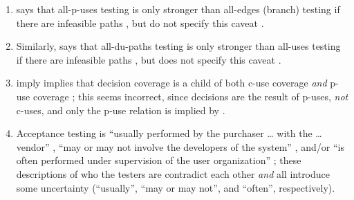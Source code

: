 \begin{enumerate}
          every use (both \acs{p-use} and \acs{c-use}) of that definition (with no
          intervening definitions)'' (\citealp[p.~29]{IEEE2021}; similar in
          \citeyear[p.~125]{IEEE2017}; \citealp[p.~5-13]{SWEBOK2024};
          \citealp[p.~479]{PetersAndPedrycz2000}); however, paths containing
          simple cycles may also be required \citep[p.~425]{vanVliet2000}.
    \item %
           {} says that all-\acsp{p-use}
          testing is only stronger than all-edges (branch) testing if there are
          infeasible paths \citeyearpar[pp.~432-433]{vanVliet2000}, but
          \citeauthor{IEEE2021} \ifnotpaper do \else \does \fi not specify this
          caveat \citeyearpar[Fig.~F.1]{IEEE2021}.
    \item %
          Similarly, \citeauthor{vanVliet2000} says that all-\acsp{du-path}
          testing is only stronger than all-uses testing if there are
          infeasible paths \citeyearpar[pp.~432-433]{vanVliet2000}, but
          \citeauthor{SWEBOK2024} does not specify this caveat
          \citeyearpar[p.~5-13]{SWEBOK2024}.
    \item %
           \citeauthor{PetersAndPedrycz2000} \ifnotpaper imply \else
              implies \fi that decision coverage is a child of both \acs{c-use}
          coverage \emph{and} \acs{p-use} coverage \citeyearpar[Fig.~12.31]{
              PetersAndPedrycz2000}; this seems incorrect, since decisions are
          the result of \acsp{p-use}, \emph{not} \acsp{c-use}, and only the
          \acs{p-use} relation is implied by \citep[Fig.~F.1%
              ]{IEEE2021}.
    \item %
          Acceptance testing is ``usually performed by the purchaser \dots{}
          with the \dots{} vendor'' \citep[p.~5]{IEEE2017}, ``may or may not
          involve the developers of the system'' \citep[p.~4-6]{SWEBOK2014},
          and/or ``is often performed under supervision of the user
          organization'' \citep[p.~439]{vanVliet2000}; these descriptions
          of who the testers are contradict each other \emph{and} all introduce
          some uncertainty
          (``usually'', ``may or may not'', and ``often'', respectively).


\end{enumerate}
